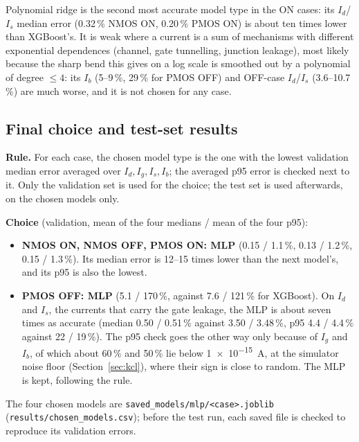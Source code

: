 \documentclass[11pt,a4paper]{article}
\begin{document}
Polynomial ridge is the second most accurate model type in the ON cases: its $I_d$/$I_s$ median error
(0.32\,\% NMOS ON, 0.20\,\% PMOS ON) is about ten times lower than XGBoost's. It is weak where a current is
a sum of mechanisms with different exponential dependences (channel, gate tunnelling, junction leakage),
most likely because the sharp bend this gives on a log scale is smoothed out by a polynomial of degree
$\le 4$: its $I_b$ (5--9\,\%, 29\,\% for PMOS OFF) and OFF-case $I_d$/$I_s$ (3.6--10.7\,\%) are much worse,
and it is not chosen for any case.

\subsection{Final choice and test-set results}\label{sec:choice}
\textbf{Rule.} For each case, the chosen model type is the one with the lowest validation median
error averaged over $I_d, I_g, I_s, I_b$; the averaged p95 error is checked next to it. Only the
validation set is used for the choice; the test set is used afterwards, on the chosen models only.

\textbf{Choice} (validation, mean of the four medians / mean of the four p95):
\begin{itemize}
  \item \textbf{NMOS ON, NMOS OFF, PMOS ON: MLP} (0.15 / 1.1\,\%, 0.13 / 1.2\,\%, 0.15 / 1.3\,\%). Its median
        error is 12--15 times lower than the next model's, and its p95 is also the lowest.
  \item \textbf{PMOS OFF: MLP} (5.1 / 170\,\%, against 7.6 / 121\,\% for XGBoost). On $I_d$ and $I_s$, the
        currents that carry the gate leakage, the MLP is about seven times as accurate (median 0.50 / 0.51\,\%
        against 3.50 / 3.48\,\%, p95 4.4 / 4.4\,\% against 22 / 19\,\%). The p95 check goes the other way only because
        of $I_g$ and $I_b$, of which about 60\,\% and 50\,\% lie below \SI{1e-15}{A}, at the simulator
        noise floor (Section~\ref{sec:kcl}), where their sign is close to random. The MLP is kept,
        following the rule.
\end{itemize}
The four chosen models are \texttt{saved\_models/mlp/<case>.joblib} (\texttt{results/chosen\_models.csv});
before the test run, each saved file is checked to reproduce its validation errors.
\end{document}
